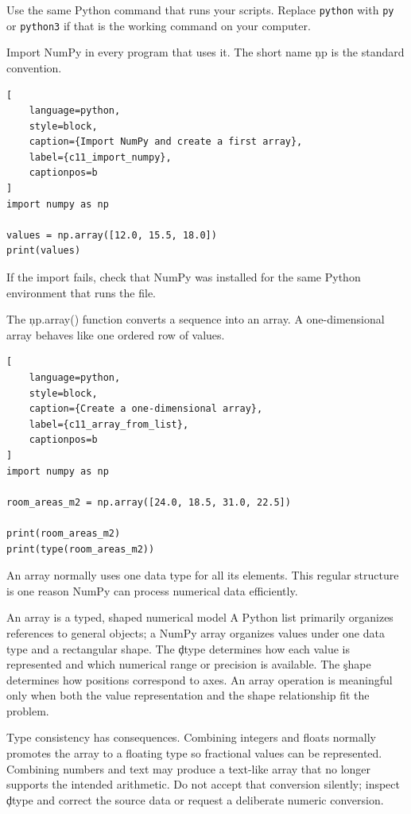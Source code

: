 Use the same Python command that runs your scripts. Replace \texttt{python}
with \texttt{py} or \texttt{python3} if that is the working command on your
computer.

Import NumPy in every program that uses it. The short name \c{np} is the
standard convention.

\begin{lstlisting}[
    language=python,
    style=block,
    caption={Import NumPy and create a first array},
    label={c11_import_numpy},
    captionpos=b
]
import numpy as np

values = np.array([12.0, 15.5, 18.0])
print(values)
\end{lstlisting}

If the import fails, check that NumPy was installed for the same Python
environment that runs the file.


The \c{np.array()} function converts a sequence into an array. A one-dimensional
array behaves like one ordered row of values.

\begin{lstlisting}[
    language=python,
    style=block,
    caption={Create a one-dimensional array},
    label={c11_array_from_list},
    captionpos=b
]
import numpy as np

room_areas_m2 = np.array([24.0, 18.5, 31.0, 22.5])

print(room_areas_m2)
print(type(room_areas_m2))
\end{lstlisting}

An array normally uses one data type for all its elements. This regular
structure is one reason NumPy can process numerical data efficiently.

\begin{ExplainBox}{An array is a typed, shaped numerical model}
A Python list primarily organizes references to general objects; a NumPy array
organizes values under one data type and a rectangular shape. The \c{dtype}
determines how each value is represented and which numerical range or
precision is available. The \c{shape} determines how positions correspond to
axes. An array operation is meaningful only when both the value representation
and the shape relationship fit the problem.
\end{ExplainBox}

Type consistency has consequences. Combining integers and floats normally
promotes the array to a floating type so fractional values can be represented.
Combining numbers and text may produce a text-like array that no longer
supports the intended arithmetic. Do not accept that conversion silently;
inspect \c{dtype} and correct the source data or request a deliberate numeric
conversion.

